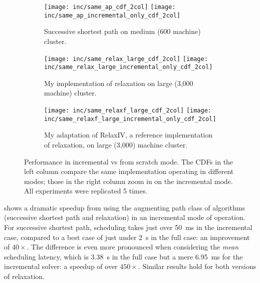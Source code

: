 \begin{figure}
    \begin{widepage}
        \begin{subfigure}[c]{\textwidth}
            \texttt{[image: inc/same\_ap\_cdf\_2col]}
            \texttt{[image: inc/same\_ap\_incremental\_only\_cdf\_2col]}
            \caption{Successive shortest path on medium (600 machine) cluster.}
            \label{fig:inc-same:ssp}
        \end{subfigure}
        \begin{subfigure}[c]{\textwidth}
            \texttt{[image: inc/same\_relax\_large\_cdf\_2col]}                        \texttt{[image: inc/same\_relax\_large\_incremental\_only\_cdf\_2col]}
            \caption{My implementation of relaxation on large (3,000 machine) cluster.}
            \label{fig:inc-same:relax-my}
        \end{subfigure}
        \begin{subfigure}[c]{\textwidth}
            \texttt{[image: inc/same\_relaxf\_large\_cdf\_2col]}
            \texttt{[image: inc/same\_relaxf\_large\_incremental\_only\_cdf\_2col]}
            \caption{My adaptation of RelaxIV, a reference implementation of relaxation, on large (3,000) machine cluster.}
            \label{fig:inc-same:relax-iv}
        \end{subfigure}
    \end{widepage}
    \caption[Performance in incremental vs from scratch mode]{Performance in incremental vs from scratch mode. The CDFs in the left column compare the same implementation operating in different modes; those in the right column zoom in on the incremental mode. All experiments were replicated 5 times.}
    \label{fig:inc-same}
\end{figure}

 shows a dramatic speedup from using the augmenting path class of algorithms (successive shortest path and relaxation) in an incremental mode of operation. For successive shortest path, scheduling takes just over \SI{50}{\milli\second} in the incremental case, compared to a best case of just under \SI{2}{\second} in the full case: an improvement of $40\times$. The difference is even more pronounced when considering the \emph{mean} scheduling latency, which is \SI{3.38}{\second} in the full case but a mere \SI{6.95}{\milli\second} for the incremental solver: a speedup of over $450\times$. Similar results hold for both versions of relaxation.

